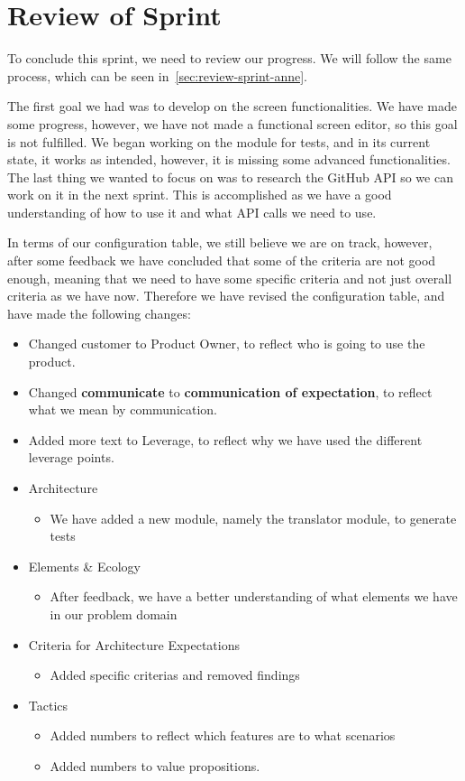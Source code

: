 \section{Review of Sprint}\label{sec:review-sprint-two}
To conclude this sprint, we need to review our progress.
We will follow the same process, which can be seen in~\autoref{sec:review-sprint-anne}.

The first goal we had was to develop on the screen functionalities.
We have made some progress, however, we have not made a functional screen editor, so this goal is not fulfilled.
We began working on the module for tests, and in its current state, it works as intended, however, it is missing some advanced functionalities.
The last thing we wanted to focus on was to research the GitHub API so we can work on it in the next sprint.
This is accomplished as we have a good understanding of how to use it and what API calls we need to use.

In terms of our configuration table, we still believe we are on track, however, after some feedback we have concluded that some of the criteria are not good enough, meaning that we need to have some specific criteria and not just overall criteria as we have now.
Therefore we have revised the configuration table, and have made the following changes:


\begin{itemize}
    \item Changed customer to Product Owner, to reflect who is going to use the product.
    \item Changed \textbf{communicate} to \textbf{communication of expectation}, to reflect what we mean by communication.
    \item Added more text to Leverage, to reflect why we have used the different leverage points.
    \item Architecture
        \begin{itemize}
            \item We have added a new module, namely the translator module, to generate tests
        \end{itemize}
    \item Elements \& Ecology
        \begin{itemize}
            \item After feedback, we have a better understanding of what elements we have in our problem domain
        \end{itemize}
    \item Criteria for Architecture Expectations
        \begin{itemize}
            \item Added specific criterias and removed findings
        \end{itemize} 
    \item Tactics
        \begin{itemize}
            \item Added numbers to reflect which features are to what scenarios
            \item Added numbers to value propositions.
        \end{itemize} 
\end{itemize}

